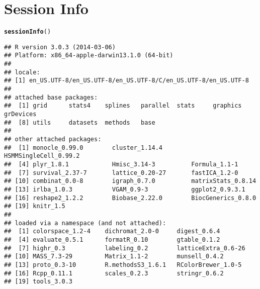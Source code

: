 \documentclass[10pt,oneside]{article}\usepackage[]{graphicx}\usepackage[]{color}
\makeatletter
\newcommand{\hlstd}[1]{\textcolor[rgb]{0.345,0.345,0.345}{#1}}%
\newcommand{\hlkwd}[1]{\textcolor[rgb]{0.737,0.353,0.396}{\textbf{#1}}}%
\newenvironment{kframe}{%
 \def\at@end@of@kframe{}%
 \ifinner\ifhmode%
  \def\at@end@of@kframe{\end{minipage}}%
  \begin{minipage}{\columnwidth}%
 \fi\fi%
 \def\FrameCommand##1{\hskip\@totalleftmargin \hskip-\fboxsep
 \colorbox{shadecolor}{##1}\hskip-\fboxsep
     \hskip-\linewidth \hskip-\@totalleftmargin \hskip\columnwidth}%
 \MakeFramed {\advance\hsize-\width
   \@totalleftmargin\z@ \linewidth\hsize
   \@setminipage}}%
 {\par\unskip\endMakeFramed%
 \at@end@of@kframe}
\newenvironment{knitrout}{}{} %
\makeatother
\begin{document}
\section{Session Info}
\begin{knitrout}
\color{fgcolor}\begin{kframe}
\begin{alltt}
\hlkwd{sessionInfo}\hlstd{()}
\end{alltt}
\begin{verbatim}
## R version 3.0.3 (2014-03-06)
## Platform: x86_64-apple-darwin13.1.0 (64-bit)
## 
## locale:
## [1] en_US.UTF-8/en_US.UTF-8/en_US.UTF-8/C/en_US.UTF-8/en_US.UTF-8
## 
## attached base packages:
##  [1] grid      stats4    splines   parallel  stats     graphics  grDevices
##  [8] utils     datasets  methods   base     
## 
## other attached packages:
##  [1] monocle_0.99.0        cluster_1.14.4        HSMMSingleCell_0.99.2
##  [4] plyr_1.8.1            Hmisc_3.14-3          Formula_1.1-1        
##  [7] survival_2.37-7       lattice_0.20-27       fastICA_1.2-0        
## [10] combinat_0.0-8        igraph_0.7.0          matrixStats_0.8.14   
## [13] irlba_1.0.3           VGAM_0.9-3            ggplot2_0.9.3.1      
## [16] reshape2_1.2.2        Biobase_2.22.0        BiocGenerics_0.8.0   
## [19] knitr_1.5            
## 
## loaded via a namespace (and not attached):
##  [1] colorspace_1.2-4    dichromat_2.0-0     digest_0.6.4       
##  [4] evaluate_0.5.1      formatR_0.10        gtable_0.1.2       
##  [7] highr_0.3           labeling_0.2        latticeExtra_0.6-26
## [10] MASS_7.3-29         Matrix_1.1-2        munsell_0.4.2      
## [13] proto_0.3-10        R.methodsS3_1.6.1   RColorBrewer_1.0-5 
## [16] Rcpp_0.11.1         scales_0.2.3        stringr_0.6.2      
## [19] tools_3.0.3
\end{verbatim}
\end{kframe}
\end{knitrout}




\end{document}
